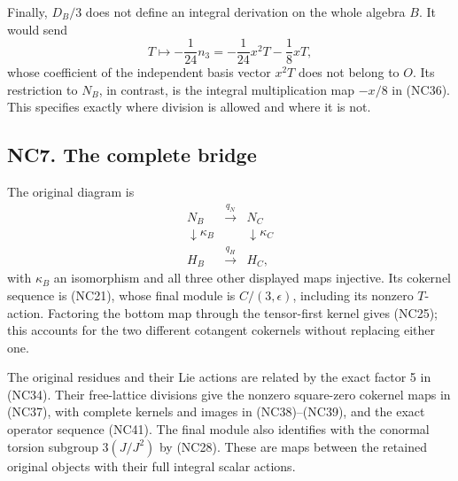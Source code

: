 \documentclass[
  10pt,
]{article}
\begin{document}
Finally, \(D_B/3\) does not define an integral derivation on the whole
algebra \(B\). It would send \[
T\longmapsto-\frac1{24}n_3
=-\frac1{24}x^2T-\frac18xT,
\tag{NC43}
\] whose coefficient of the independent basis vector \(x^2T\) does not
belong to \(O\). Its restriction to \(N_B\), in contrast, is the
integral multiplication map \(-x/8\) in (NC36). This specifies exactly
where division is allowed and where it is not.

\subsection{NC7. The complete bridge}\label{nc7.-the-complete-bridge}

The original diagram is \[
\begin{matrix}
N_B&\xrightarrow{q_N}&N_C\\
\downarrow\kappa_B&&\downarrow\kappa_C\\
H_B&\xrightarrow{q_H}&H_C,
\end{matrix}
\] with \(\kappa_B\) an isomorphism and all three other displayed maps
injective. Its cokernel sequence is (NC21), whose final module is
\(C/(3,\epsilon)\), including its nonzero \(T\)-action. Factoring the
bottom map through the tensor-first kernel gives (NC25); this accounts
for the two different cotangent cokernels without replacing either one.

The original residues and their Lie actions are related by the exact
factor 5 in (NC34). Their free-lattice divisions give the nonzero
square-zero cokernel maps in (NC37), with complete kernels and images in
(NC38)--(NC39), and the exact operator sequence (NC41). The final module
also identifies with the conormal torsion subgroup \(3(J/J^2)\) by
(NC28). These are maps between the retained original objects with their
full integral scalar actions.
\end{document}
